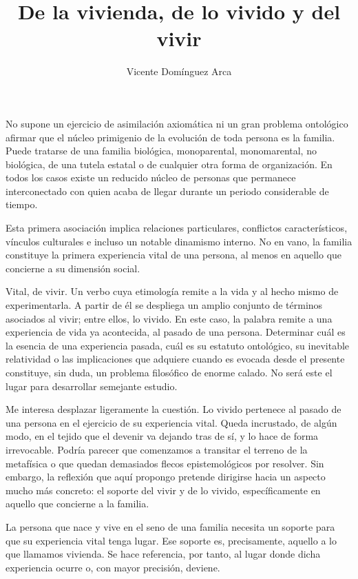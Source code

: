 \documentclass[12pt,a4paper]{article}
\title{De la vivienda, de lo vivido y del vivir}
\author{Vicente Domínguez Arca}
\date{}
\begin{document}
\maketitle

No supone un ejercicio de asimilación axiomática ni un gran problema ontológico afirmar que el núcleo primigenio de la evolución de toda persona es la familia. Puede tratarse de una familia biológica, monoparental, monomarental, no biológica, de una tutela estatal o de cualquier otra forma de organización. En todos los casos existe un reducido núcleo de personas que permanece interconectado con quien acaba de llegar durante un periodo considerable de tiempo.

Esta primera asociación implica relaciones particulares, conflictos característicos, vínculos culturales e incluso un notable dinamismo interno. No en vano, la familia constituye la primera experiencia vital de una persona, al menos en aquello que concierne a su dimensión social.

Vital, de vivir. Un verbo cuya etimología remite a la vida y al hecho mismo de experimentarla. A partir de él se despliega un amplio conjunto de términos asociados al vivir; entre ellos, lo vivido. En este caso, la palabra remite a una experiencia de vida ya acontecida, al pasado de una persona. Determinar cuál es la esencia de una experiencia pasada, cuál es su estatuto ontológico, su inevitable relatividad o las implicaciones que adquiere cuando es evocada desde el presente constituye, sin duda, un problema filosófico de enorme calado. No será este el lugar para desarrollar semejante estudio.

Me interesa desplazar ligeramente la cuestión. Lo vivido pertenece al pasado de una persona en el ejercicio de su experiencia vital. Queda incrustado, de algún modo, en el tejido que el devenir va dejando tras de sí, y lo hace de forma irrevocable. Podría parecer que comenzamos a transitar el terreno de la metafísica o que quedan demasiados flecos epistemológicos por resolver. Sin embargo, la reflexión que aquí propongo pretende dirigirse hacia un aspecto mucho más concreto: el soporte del vivir y de lo vivido, específicamente en aquello que concierne a la familia.

La persona que nace y vive en el seno de una familia necesita un soporte para que su experiencia vital tenga lugar. Ese soporte es, precisamente, aquello a lo que llamamos vivienda. Se hace referencia, por tanto, al lugar donde dicha experiencia ocurre o, con mayor precisión, deviene.
\end{document}
